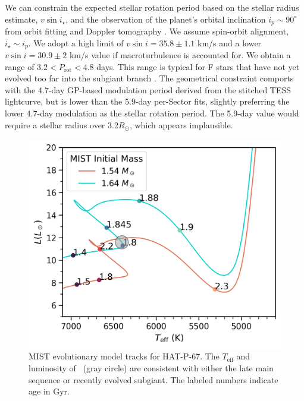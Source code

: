 \documentclass[twocolumn]{aastex631}
\newcommand{\hatp}{\object{HAT-P-67}~}
\begin{document}
We can constrain the expected stellar rotation period based on the stellar radius estimate, $v\sin{i_\star}$, and the observation of the planet's orbital inclination $i_p\sim90^\circ$ from orbit fitting and Doppler tomography \citep{2017AJ....153..211Z}.  We assume spin-orbit alignment, $i_\star \sim i_p$.  We adopt a high limit of $v\sin{i}=35.8\pm1.1$ km/s and a lower $v\sin{i}=30.9\pm2$ km/s value if macroturbulence is accounted for.  We obtain a range of $3.2 < P_\mathrm{rot}  < 4.8 $ days.  This range is typical for F stars that have not yet evolved too far into the subgiant branch \citep{2022ApJ...930....7A}.  The geometrical constraint comports with the 4.7-day GP-based modulation period derived from the stitched TESS lightcurve, but is lower than the 5.9-day per-Sector fits, slightly preferring the lower 4.7-day modulation as the stellar rotation period.  The 5.9-day value would require a stellar radius over 3.2$R_\odot$, which appears implausible.




\begin{figure}
    \centering
    \includegraphics[width=0.98\linewidth]{figures/MIST_only_HATP.png}
    \caption{MIST evolutionary model tracks for HAT-P-67.  The $T_\mathrm{eff}$ and luminosity of \hatp (gray circle) are consistent with either the late main sequence or recently evolved subgiant.  The labeled numbers indicate age in Gyr.}
    \label{fig:evolTracks}
\end{figure}
\end{document}

